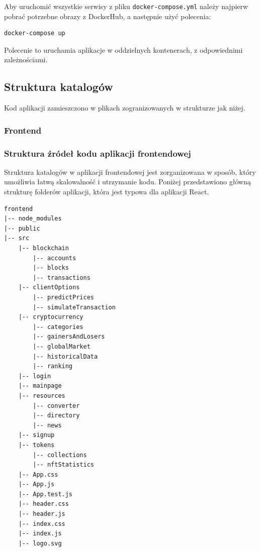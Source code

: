 Aby uruchomić wszystkie serwisy z pliku \texttt{docker-compose.yml} należy najpierw pobrać potrzebne obrazy z DockerHub, a następnie użyć polecenia:
\begin{lstlisting}[basicstyle=\footnotesize\ttfamily]
docker-compose up
\end{lstlisting}

Polecenie to uruchamia aplikacje w oddzielnych kontenerach, z odpowiednimi zależnościami.

\subsection{Struktura katalogów}
Kod aplikacji zamieszczono w plikach zogranizowanych w strukturze jak niżej.
\subsubsection{Frontend}
\subsubsection{Struktura źródeł kodu aplikacji frontendowej}
Struktura katalogów w aplikacji frontendowej jest zorganizowana w sposób, który umożliwia łatwą skalowalność i utrzymanie kodu. Poniżej przedstawiono główną strukturę folderów aplikacji, która jest typowa dla aplikacji React.
\begin{multicols}{2}
\begin{lstlisting}[basicstyle=\footnotesize\ttfamily]
frontend
|-- node_modules
|-- public
|-- src
    |-- blockchain
        |-- accounts
        |-- blocks
        |-- transactions
    |-- clientOptions
        |-- predictPrices
        |-- simulateTransaction
    |-- cryptocurrency
        |-- categories
        |-- gainersAndLosers
        |-- globalMarket
        |-- historicalData
        |-- ranking
    |-- login
    |-- mainpage
    |-- resources
        |-- converter
        |-- directory
        |-- news
    |-- signup
    |-- tokens
        |-- collections
        |-- nftStatistics
    |-- App.css
    |-- App.js
    |-- App.test.js
    |-- header.css
    |-- header.js
    |-- index.css
    |-- index.js
    |-- logo.svg
\end{lstlisting}
\end{multicols}

